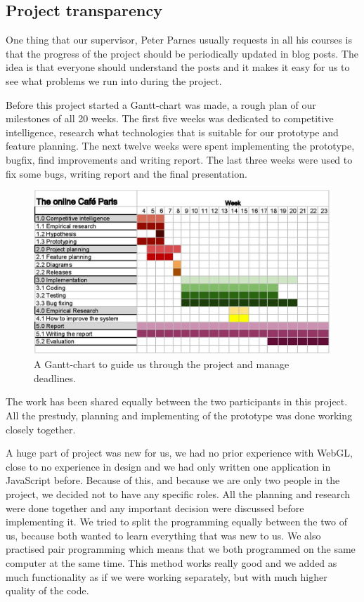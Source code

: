 \documentclass[12pt, titlepage]{article}
\begin{document}
\subsection{Project transparency}
One thing that our supervisor, Peter Parnes usually requests in all his courses is that the progress of the project should be periodically updated in blog posts\cite{1}. The idea is that everyone should understand the posts and it makes it easy for us to see what problems we run into during the project.

Before this project started a Gantt-chart was made, a rough plan of our milestones of all 20 weeks. The first five weeks was dedicated to competitive intelligence, research what technologies that is suitable for our prototype and feature planning. The next twelve weeks were spent implementing the prototype, bugfix, find improvements and writing report. The last three weeks were used to fix some bugs, writing report and the final presentation.
\begin{figure}[H]
  \centering
	\includegraphics[width=1\textwidth,keepaspectratio]{grovplanering.jpg}
  \caption{A Gantt-chart to guide us through the project and manage deadlines.}
\end{figure}
The work has been shared equally between the two participants in this project. All the prestudy, planning and implementing of the prototype was done working closely together. 

A huge part of project was new for us, we had no prior experience with WebGL, close to no experience in design and we had only written one application in JavaScript before. Because of this, and because we are only two people in the project, we decided not to have any specific roles. All the planning and research were done together and any important decision were discussed before implementing it. We tried to split the programming equally between the two of us, because both wanted to learn everything that was new to us. We also practised pair programming which means that we both programmed on the same computer at the same time. This method works really good and we added as much functionality as if we were working separately, but with much higher quality of the code.
\end{document}
